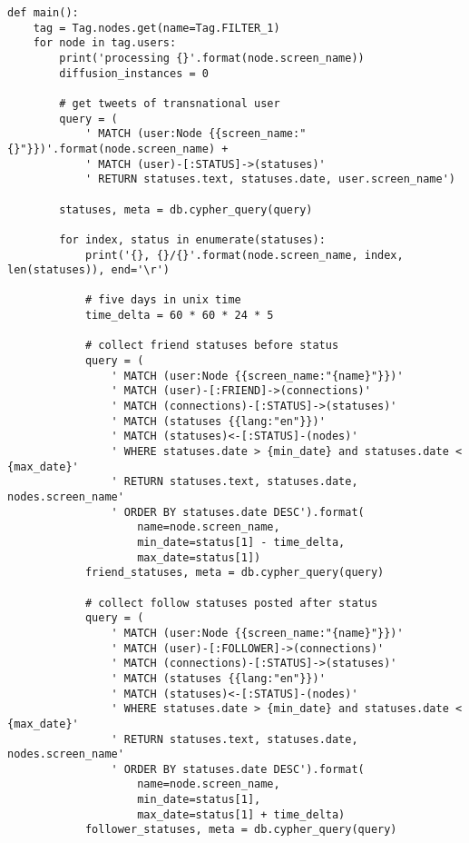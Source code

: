 \begin{lstlisting}
def main():
    tag = Tag.nodes.get(name=Tag.FILTER_1)
    for node in tag.users:
        print('processing {}'.format(node.screen_name))
        diffusion_instances = 0
        
        # get tweets of transnational user
        query = (
            ' MATCH (user:Node {{screen_name:"{}"}})'.format(node.screen_name) +
            ' MATCH (user)-[:STATUS]->(statuses)'
            ' RETURN statuses.text, statuses.date, user.screen_name')
        
        statuses, meta = db.cypher_query(query)
        
        for index, status in enumerate(statuses):
            print('{}, {}/{}'.format(node.screen_name, index, len(statuses)), end='\r')
            
            # five days in unix time
            time_delta = 60 * 60 * 24 * 5
            
            # collect friend statuses before status
            query = (
                ' MATCH (user:Node {{screen_name:"{name}"}})'
                ' MATCH (user)-[:FRIEND]->(connections)'
                ' MATCH (connections)-[:STATUS]->(statuses)'
                ' MATCH (statuses {{lang:"en"}})'
                ' MATCH (statuses)<-[:STATUS]-(nodes)'
                ' WHERE statuses.date > {min_date} and statuses.date < {max_date}'
                ' RETURN statuses.text, statuses.date, nodes.screen_name'
                ' ORDER BY statuses.date DESC').format(
                    name=node.screen_name,
                    min_date=status[1] - time_delta,
                    max_date=status[1])
            friend_statuses, meta = db.cypher_query(query)
            
            # collect follow statuses posted after status
            query = (
                ' MATCH (user:Node {{screen_name:"{name}"}})'
                ' MATCH (user)-[:FOLLOWER]->(connections)'
                ' MATCH (connections)-[:STATUS]->(statuses)'
                ' MATCH (statuses {{lang:"en"}})'
                ' MATCH (statuses)<-[:STATUS]-(nodes)'
                ' WHERE statuses.date > {min_date} and statuses.date < {max_date}'
                ' RETURN statuses.text, statuses.date, nodes.screen_name'
                ' ORDER BY statuses.date DESC').format(
                    name=node.screen_name,
                    min_date=status[1],
                    max_date=status[1] + time_delta)
            follower_statuses, meta = db.cypher_query(query)
            

\end{lstlisting}
